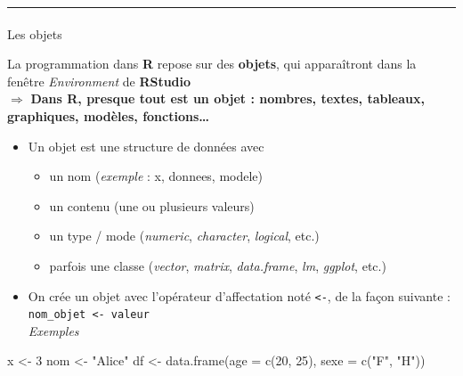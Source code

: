 \documentclass[
  french,
  10pt,
  a4paper,
]{article}
\makeatletter
\let\oldparagraph\paragraph
\renewcommand{\paragraph}{
    \@ifstar
      \xxxParagraphStar
      \xxxParagraphNoStar
  }
\newcommand{\xxxParagraphStar}[1]{\oldparagraph*{#1}\mbox{}}
\newcommand{\xxxParagraphNoStar}[1]{\oldparagraph{#1}\mbox{}}
\newenvironment{Shaded}{}{}
\newcommand{\AttributeTok}[1]{\textcolor[rgb]{0.65,0.15,0.64}{#1}}
\newcommand{\DecValTok}[1]{\textcolor[rgb]{0.60,0.41,0.00}{#1}}
\newcommand{\FunctionTok}[1]{\textcolor[rgb]{0.25,0.47,0.95}{#1}}
\newcommand{\NormalTok}[1]{\textcolor[rgb]{0.22,0.23,0.26}{#1}}
\newcommand{\OtherTok}[1]{\textcolor[rgb]{0.15,0.68,0.38}{#1}}
\newcommand{\StringTok}[1]{\textcolor[rgb]{0.31,0.63,0.31}{#1}}
\providecommand{\tightlist}{%
  \setlength{\itemsep}{0pt}\setlength{\parskip}{0pt}}
\makeatother
\begin{document}
\begin{center}\rule{0.5\linewidth}{0.5pt}\end{center}

\paragraph{Les objets}\label{les-objets}

La programmation dans \textbf{R} repose sur des \textbf{objets}, qui
apparaîtront dans la fenêtre \emph{Environment} de \textbf{RStudio}\\
\(\Rightarrow\) \textbf{Dans R, presque tout est un objet : nombres,
textes, tableaux, graphiques, modèles, fonctions\ldots{}}

\begin{itemize}
\tightlist
\item
  Un objet est une structure de données avec

  \begin{itemize}
  \tightlist
  \item
    un nom (\emph{exemple} : x, donnees, modele)
  \item
    un contenu (une ou plusieurs valeurs)
  \item
    un type / mode (\emph{numeric}, \emph{character}, \emph{logical},
    etc.)
  \item
    parfois une classe (\emph{vector}, \emph{matrix}, \emph{data.frame},
    \emph{lm}, \emph{ggplot}, etc.)
  \end{itemize}
\item
  On crée un objet avec l'opérateur d'affectation noté
  \texttt{\textless{}-}, de la façon suivante :
  \texttt{nom\_objet\ \textless{}-\ valeur}\\
  \emph{Exemples}
\end{itemize}

\begin{Shaded}
\begin{Highlighting}[]
\NormalTok{x }\OtherTok{\textless{}{-}} \DecValTok{3}
\NormalTok{nom }\OtherTok{\textless{}{-}} \StringTok{"Alice"}
\NormalTok{df }\OtherTok{\textless{}{-}} \FunctionTok{data.frame}\NormalTok{(}\AttributeTok{age =} \FunctionTok{c}\NormalTok{(}\DecValTok{20}\NormalTok{, }\DecValTok{25}\NormalTok{), }\AttributeTok{sexe =} \FunctionTok{c}\NormalTok{(}\StringTok{"F"}\NormalTok{, }\StringTok{"H"}\NormalTok{))}
\end{Highlighting}
\end{Shaded}
\end{document}
